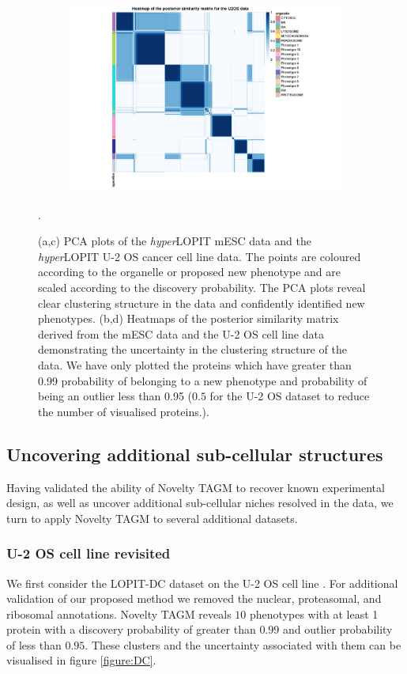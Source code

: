 \documentclass[12pt,english]{article}
\begin{document}
\begin{figure}[ht]
\begin{subfigure}[t]{0.5\textwidth}
	\centering
	\includegraphics[height=2.5in]{heatmapuU2oshl.jpg}
	\caption{}
\end{subfigure}
	\caption{(a,c) PCA plots of the \textit{hyper}LOPIT mESC data and the \textit{hyper}LOPIT U-2 OS cancer cell line data. The points are coloured according to the organelle or proposed new phenotype and are scaled according to the discovery probability. The PCA plots reveal clear clustering structure in the data and confidently identified new phenotypes. (b,d) Heatmaps of the posterior similarity matrix derived from the mESC data and the U-2 OS cell line data demonstrating the uncertainty in the clustering structure of the data. We have only plotted the proteins which have greater than 0.99 probability of belonging to a new phenotype and probability of being an outlier less than 0.95 ($0.5$ for the U-2 OS dataset to reduce the number of visualised proteins.).}
	\label{figure:mouse}.
\end{figure}
\clearpage
\subsection{Uncovering additional sub-cellular structures}
Having validated the ability of Novelty TAGM to recover known experimental design, as well as uncover additional sub-cellular niches resolved in the data, we turn to apply Novelty TAGM to several additional datasets.

\subsubsection{U-2 OS cell line revisited}
 We first consider the LOPIT-DC dataset on the U-2 OS cell line \citep{DC:2018}. For additional validation of our proposed method we removed the nuclear, proteasomal, and ribosomal annotations. Novelty TAGM reveals $10$ phenotypes with at least 1 protein with a discovery probability of greater than $0.99$ and outlier probability of less than $0.95$. These clusters and the uncertainty associated with them can be visualised in figure \ref{figure:DC}.
\end{document}
